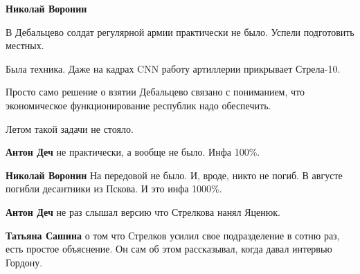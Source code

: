 \begin{itemize}
\begin{itemize}
 
\textbf{Николай Воронин} 

В Дебальцево солдат регулярной армии практически не было. Успели подготовить
местных.

Была техника. Даже на кадрах CNN работу артиллерии прикрывает Стрела-10.

Просто само решение о взятии Дебальцево связано с пониманием, что экономическое
функционирование республик надо обеспечить.

Летом такой задачи не стояло.

 
\textbf{Антон Деч} не практически, а вообще не было. Инфа 100\%.

 
\textbf{Николай Воронин} На передовой не было. И, вроде, никто не погиб.
В августе погибли десантники из Пскова. И это инфа 1000\%.

 
\textbf{Антон Деч} не раз слышал версию что Стрелкова нанял Яценюк.

 
\textbf{Татьяна Сашина} о том что Стрелков усилил свое подразделение в сотню раз, есть простое объяснение. Он сам об этом рассказывал, когда давал интервью Гордону.


\end{itemize}
\end{itemize}
